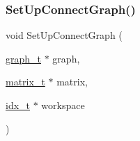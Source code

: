 \subsubsection{\texorpdfstring{Set\+Up\+Connect\+Graph()}{SetUpConnectGraph()}}
{\footnotesize\ttfamily void Set\+Up\+Connect\+Graph (\begin{DoxyParamCaption}\item[{\hyperlink{a00734}{graph\+\_\+t} $\ast$}]{graph,  }\item[{\hyperlink{a00754}{matrix\+\_\+t} $\ast$}]{matrix,  }\item[{\hyperlink{a00876_aaa5262be3e700770163401acb0150f52}{idx\+\_\+t} $\ast$}]{workspace }\end{DoxyParamCaption})}

